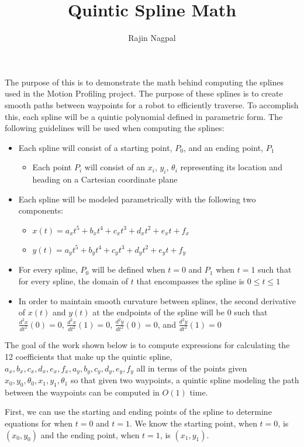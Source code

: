 \documentclass[12pt, letterpaper]{article}
\title{Quintic Spline Math}
\author{Rajin Nagpal}
\begin{document}
\maketitle

The purpose of this is to demonstrate the math behind computing the splines used in the Motion Profiling project. The purpose of these splines is to create smooth paths between waypoints for a robot to efficiently traverse. To accomplish this, each spline will be a quintic polynomial defined in parametric form. The following guidelines will be used when computing the splines: \begin{itemize}
\item Each spline will consist of a starting point, $P_0$, and an ending point, $P_1$ \begin{itemize}
\item Each point $P_i$ will consist of an $x_i$, $y_i$, $\theta_i$ representing its location and heading on a Cartesian coordinate plane
\end{itemize}
\item Each spline will be modeled parametrically with the following two components: \begin{itemize}
\item $x(t) = a_x t^5 + b_x t^4 + c_x t^3 + d_x t^2 + e_x t + f_x$
\item $y(t) = a_y t^5 + b_y t^4 + c_y t^3 + d_y t^2 + e_y t + f_y$
\end{itemize}
\item For every spline, $P_0$ will be defined when $t = 0$ and $P_1$ when $t = 1$ such that for every spline, the domain of $t$ that encompasses the spline is $0 \leq t \leq 1$
\item In order to maintain smooth curvature between splines, the second derivative of $x(t)$ and $y(t)$ at the endpoints of the spline will be $0$ such that $\frac{d^2x}{dt^2} (0) = 0$, $\frac{d^2x}{dt^2} (1) = 0$, $\frac{d^2y}{dt^2} (0) = 0$, and $\frac{d^2y}{dt^2} (1) = 0$
\end{itemize}

The goal of the work shown below is to compute expressions for calculating the 12 coefficients that make up the quintic spline, $a_x, b_x, c_x, d_x, e_x, f_x, a_y, b_y, c_y, d_y, e_y, f_y$ all in terms of the points given $x_0, y_0, \theta_0, x_1, y_1, \theta_1$ so that given two waypoints, a quintic spline modeling the path between the waypoints can be computed in $O(1)$ time.

\newpage
First, we can use the starting and ending points of the spline to determine equations for when $t = 0$ and $t = 1$. We know the starting point, when $t = 0$, is $(x_0, y_0)$ and the ending point, when $t = 1$, is $(x_1, y_1)$. \\
\end{document}

